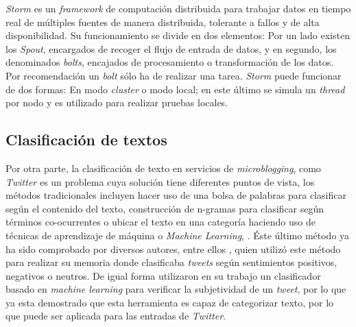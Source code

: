 \textit{Storm} es un \textit{framework} de computación distribuida para trabajar datos en tiempo real de múltiples fuentes de manera distribuida, tolerante a fallos y de alta disponibilidad. Su funcionamiento se divide en dos elementos: Por un lado existen los \textit{Spout}, encargados de recoger el flujo de entrada de datos, y en segundo, los denominados \textit{bolts}, encajados de procesamiento o transformación de los datos. Por recomendación un \textit{bolt} sólo ha de realizar una tarea. \textit{Storm} puede funcionar de dos formas: En modo \textit{cluster} o modo local; en este último se simula un \textit{thread} por nodo y es utilizado para realizar pruebas locales.

\subsection{Clasificación de textos}
\label{intro:ea:clasificacion}

Por otra parte, la clasificación de texto en servicios de \textit{microblogging}, como \textit{Twitter} es un problema cuya solución tiene diferentes puntos de vista, los métodos tradicionales incluyen hacer uso de una bolsa de palabras para clasificar según el contenido del texto, construcción de n-gramas para clasificar según términos co-ocurrentes o ubicar el texto en una categoría haciendo uso de técnicas de aprendizaje de máquina o \textit{Machine Learning}, \cite{EventDetection}. Éste último método ya ha sido comprobado por diversos autores, entre ellos \cite{Maldonado}, quien utilizó este método para realizar su memoria donde clasificaba \textit{tweets} según sentimientos positivos, negativos o neutros. De igual forma \cite{WladdimiroPMI} utilizaron en su trabajo un clasificador basado en \textit{machine learning} para verificar la subjetividad de un \textit{tweet}, por lo que ya esta demostrado que esta herramienta es capaz de categorizar texto, por lo que puede ser aplicada para las entradas de \textit{Twitter}.
	

	